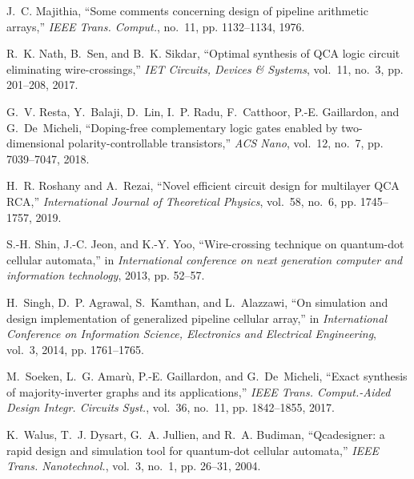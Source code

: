 \documentclass[9pt,journal,compsoc]{IEEEtran}
\begin{document}
\begin{thebibliography}{10}
J.~C. Majithia, ``Some comments concerning design of pipeline arithmetic
  arrays,'' \emph{{IEEE} Trans. Comput.}, no.~11, pp. 1132--1134, 1976.

R.~K. Nath, B.~Sen, and B.~K. Sikdar, ``Optimal synthesis of {QCA} logic
  circuit eliminating wire-crossings,'' \emph{IET Circuits, Devices \&
  Systems}, vol.~11, no.~3, pp. 201--208, 2017.

G.~V. Resta, Y.~Balaji, D.~Lin, I.~P. Radu, F.~Catthoor, P.-E. Gaillardon, and
  G.~De~Micheli, ``Doping-free complementary logic gates enabled by
  two-dimensional polarity-controllable transistors,'' \emph{ACS Nano},
  vol.~12, no.~7, pp. 7039--7047, 2018.

H.~R. Roshany and A.~Rezai, ``Novel efficient circuit design for multilayer
  {QCA RCA},'' \emph{International Journal of Theoretical Physics}, vol.~58,
  no.~6, pp. 1745--1757, 2019.

S.-H. Shin, J.-C. Jeon, and K.-Y. Yoo, ``Wire-crossing technique on quantum-dot
  cellular automata,'' in \emph{International conference on next generation
  computer and information technology}, 2013, pp. 52--57.

H.~Singh, D.~P. Agrawal, S.~Kamthan, and L.~Alazzawi, ``On simulation and
  design implementation of generalized pipeline cellular array,'' in
  \emph{International Conference on Information Science, Electronics and
  Electrical Engineering}, vol.~3, 2014, pp. 1761--1765.

M.~Soeken, L.~G. Amar{\`u}, P.-E. Gaillardon, and G.~De~Micheli, ``Exact
  synthesis of majority-inverter graphs and its applications,'' \emph{{IEEE}
  Trans. Comput.-Aided Design Integr. Circuits Syst.}, vol.~36, no.~11, pp.
  1842--1855, 2017.

K.~{Walus}, T.~J. {Dysart}, G.~A. {Jullien}, and R.~A. {Budiman},
  ``Qcadesigner: a rapid design and simulation tool for quantum-dot cellular
  automata,'' \emph{{IEEE} Trans. Nanotechnol.}, vol.~3, no.~1, pp. 26--31,
  2004.

\end{thebibliography}
\end{document}
